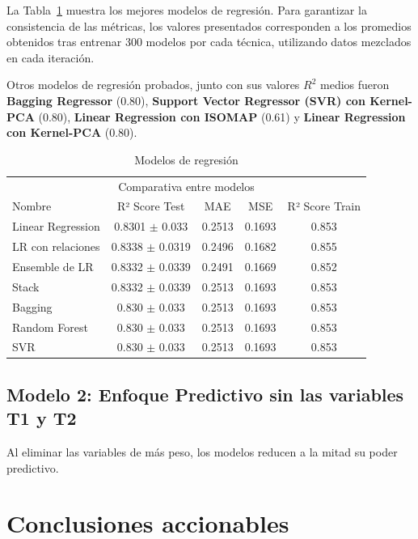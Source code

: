 \documentclass{article}
\begin{document}
La Tabla~\ref{sample-table} muestra los mejores modelos de regresión. Para garantizar la consistencia de las métricas, los valores presentados corresponden a los promedios obtenidos tras entrenar 300 modelos por cada técnica, utilizando datos mezclados en cada iteración.

Otros modelos de regresión probados, junto con sus valores \textit{$R^2$} medios fueron \textbf{Bagging Regressor} (0.80), \textbf{Support Vector Regressor (SVR) con Kernel-PCA} (0.80), \textbf{Linear Regression con ISOMAP} (0.61) y \textbf{Linear Regression con Kernel-PCA} (0.80).

\begin{table}
  \caption{Modelos de regresión}
  \label{sample-table}
  \centering
  \begin{tabular}{lcccc}
    \toprule
    \multicolumn{5}{c}{Comparativa entre modelos} \\
    \cmidrule(r){1-5}
    Nombre & R² Score Test & MAE & MSE & R² Score Train \\
    \midrule
    Linear Regression & 0.8301 $\pm$ 0.033 & 0.2513 & 0.1693 & 0.853 \\
    LR con relaciones & 0.8338 $\pm$ 0.0319 & 0.2496 & 0.1682 & 0.855 \\
    Ensemble de LR    & 0.8332 $\pm$ 0.0339 & 0.2491 & 0.1669 & 0.852 \\
    Stack             & 0.8332 $\pm$ 0.0339 & 0.2513 & 0.1693 & 0.853 \\
    Bagging           & 0.830  $\pm$ 0.033  & 0.2513 & 0.1693 & 0.853 \\
    Random Forest     & 0.830  $\pm$ 0.033  & 0.2513 & 0.1693 & 0.853 \\
    SVR               & 0.830  $\pm$ 0.033  & 0.2513 & 0.1693 & 0.853 \\
    \bottomrule
  \end{tabular}
\end{table}

\subsection{Modelo 2: Enfoque Predictivo sin las variables T1 y T2}

Al eliminar las variables de más peso, los modelos reducen a la mitad su poder predictivo.

\section{Conclusiones accionables}
\end{document}
